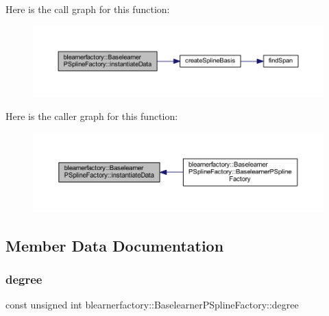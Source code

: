 Here is the call graph for this function\+:\nopagebreak
\begin{figure}[H]
\begin{center}
\leavevmode
\includegraphics[width=350pt]{classblearnerfactory_1_1_baselearner_p_spline_factory_a8e9f7977906b310d21dda5cceb15c0d8_cgraph}
\end{center}
\end{figure}
Here is the caller graph for this function\+:\nopagebreak
\begin{figure}[H]
\begin{center}
\leavevmode
\includegraphics[width=350pt]{classblearnerfactory_1_1_baselearner_p_spline_factory_a8e9f7977906b310d21dda5cceb15c0d8_icgraph}
\end{center}
\end{figure}


\subsection{Member Data Documentation}
\mbox{\label{classblearnerfactory_1_1_baselearner_p_spline_factory_aa245143409b64073ba36700c6868ece5}} 
\subsubsection{\texorpdfstring{degree}{degree}}
{\footnotesize\ttfamily const unsigned int blearnerfactory\+::\+Baselearner\+P\+Spline\+Factory\+::degree\hspace{0.3cm}{\ttfamily [private]}}



